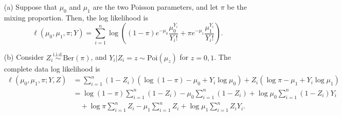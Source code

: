 \begin{enumerate}
\item[(a)] Suppose that $\mu_0$ and $\mu_1$ are the two Poisson parameters, and let $\pi$ be the mixing proportion. Then, the log likelihood is
		\begin{equation*}
		\ell(\mu_0, \mu_1, \pi; Y) = \sum_{i = 1}^n \log\left((1-\pi) e^{-\mu_0} \frac{\mu_0^{Y_i}}{Y_i!} + \pi e^{-\mu_1}\frac{\mu_1^{Y_i}}{Y_i!}\right).
		\end{equation*}

\item[(b)] Consider $Z_i \overset{\text{i.i.d.}}\sim \text{Ber}(\pi)$, and $Y_i|Z_i = z \sim \text{Poi}(\mu_z)$ for $z = 0, 1$. The complete data log likelihood is
		\begin{equation*}
		\begin{split}
		\ell(\mu_0, \mu_1, \pi; Y, Z) &= \sum_{i = 1}^n (1-Z_i)(\log (1-\pi) - \mu_0 + Y_i \log \mu_0) + Z_i(\log \pi - \mu_1 + Y_i \log \mu_1) \\
		&= \log(1-\pi)\sum_{i = 1}^n (1-Z_i) - \mu_0 \sum_{i = 1}^n (1-Z_i) + \log \mu_0 \sum_{i = 1}^n (1-Z_i)Y_i \\
		&\quad + \log \pi \sum_{i = 1}^n Z_i - \mu_1 \sum_{i = 1}^n Z_i + \log \mu_1 \sum_{i = 1}^n Z_i Y_i.
		\end{split}
\end{equation*}


\end{enumerate}
